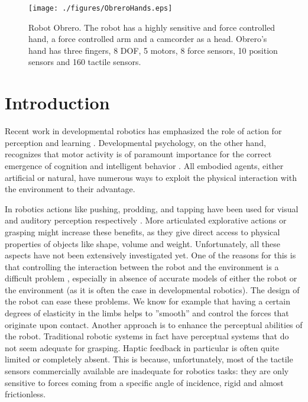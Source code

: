 \begin{figure}[tbp]
\centerline{
\texttt{[image: ./figures/ObreroHands.eps]}
} \caption{Robot Obrero. The robot has a highly sensitive and
force controlled hand, a force controlled arm and a
camcorder as a head. Obrero's hand  has three fingers, 8 DOF, 5
motors, 8 force sensors, 10 position sensors and 160 tactile
sensors.} \label{fig:RobotObrero}
\end{figure}
%
\section{Introduction}
%
Recent work in developmental robotics has emphasized the role of
action for perception and learning
\cite{metta03early,natale04learning,natale05from}. Developmental
psychology, on the other hand, recognizes that motor activity is of
paramount importance for the correct emergence of cognition and
intelligent behavior \cite{gibson88explore,streri93Seeing,bushnell93motor,hofsten04motor}.
All embodied agents, either artificial or natural, have numerous ways
to exploit the physical interaction with the environment to their
advantage. 

In robotics actions like pushing, prodding, and tapping
have been used for visual and auditory perception respectively
\cite{metta03early,etorresjara05tapping}. More articulated
explorative actions or grasping might increase these benefits, as
they give direct access to physical properties of objects like
shape, volume and weight.
%
Unfortunately, all these aspects have not been extensively
investigated yet. One of the reasons for this is that controlling
the interaction between the robot and the environment is a
difficult problem \cite{volpe90real}, especially in absence of
accurate models of either the robot or the environment (as it is
often the case in developmental robotics).
%
The design of the robot can ease these problems. We know for
example that having a certain degrees of elasticity in the limbs
helps to ''smooth''  and control the forces that originate upon
contact. Another approach is to enhance the perceptual abilities
of the robot. Traditional robotic systems in fact have perceptual
systems that do not seem adequate for grasping. Haptic feedback in
particular is often quite limited or completely absent. This is
because, unfortunately, most of the tactile sensors commercially
available are inadequate for robotics tasks: they are only
sensitive to forces coming from a specific angle of incidence,
rigid and almost frictionless.

